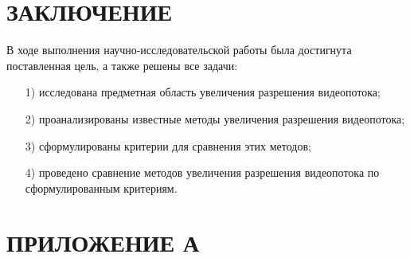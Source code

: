 \documentclass{bmstu}
\begin{document}
{\centering \chapter*{ЗАКЛЮЧЕНИЕ}}

В ходе выполнения научно-исследовательской работы была достигнута поставленная цель, а также решены все задачи:
\begin{enumerate}
\item[1)] исследована предметная область увеличения разрешения видеопотока;
\item[2)] проанализированы известные методы увеличения разрешения видеопотока;
\item[3)] сформулированы критерии для сравнения этих методов;
\item[4)] проведено сравнение методов увеличения разрешения видеопотока по сформулированным критериям.
\end{enumerate}

{\centering {\center\printbibliography[title=СПИСОК ИСПОЛЬЗОВАННЫХ ИСТОЧНИКОВ]}}

{\centering \chapter*{ПРИЛОЖЕНИЕ А}}
\end{document}
